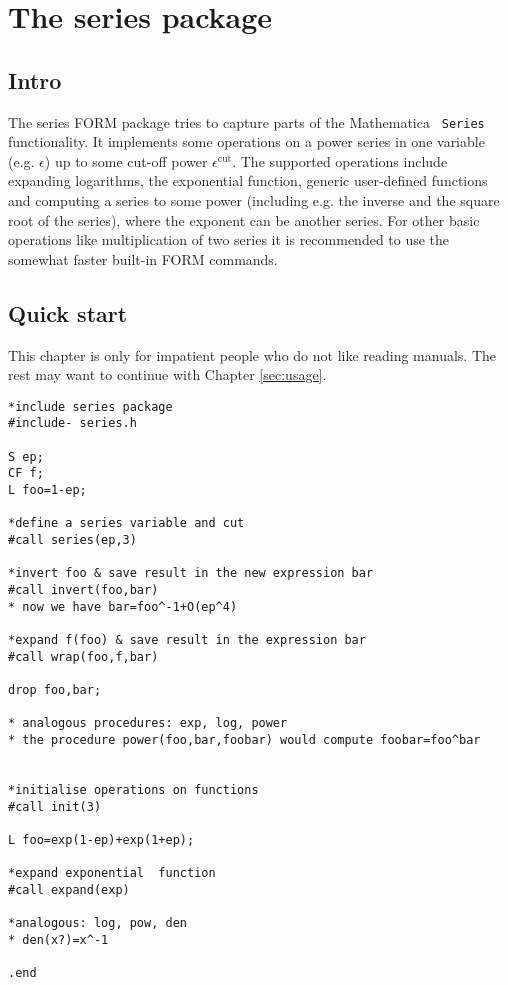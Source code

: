 \documentclass{article}
\begin{document}
\section{The series package}

\subsection{Intro}

The series FORM package tries to capture parts of the Mathematica {\tt
  Series} functionality. It implements some operations on a power
series in one variable
(e.g. $\epsilon$) up to some cut-off power $\epsilon^{\text{cut}}$. The
supported operations include expanding logarithms, the exponential
function, generic user-defined functions and
 computing a series to some power (including e.g. the inverse and
the square root of the series), where the exponent can be another
series. For other basic operations like multiplication of two series it
is recommended to use the somewhat faster built-in FORM commands.

\subsection{Quick start}
\label{sec:quick}

This chapter is only for impatient people who do not like reading
manuals. The rest may want to continue with Chapter \ref{sec:usage}.

\begin{verbatim}
*include series package
#include- series.h

S ep;
CF f;
L foo=1-ep;

*define a series variable and cut
#call series(ep,3)

*invert foo & save result in the new expression bar
#call invert(foo,bar)
* now we have bar=foo^-1+O(ep^4)

*expand f(foo) & save result in the expression bar
#call wrap(foo,f,bar)

drop foo,bar;

* analogous procedures: exp, log, power
* the procedure power(foo,bar,foobar) would compute foobar=foo^bar


*initialise operations on functions
#call init(3)

L foo=exp(1-ep)+exp(1+ep);

*expand exponential  function
#call expand(exp)

*analogous: log, pow, den
* den(x?)=x^-1

.end
\end{verbatim}
\end{document}
